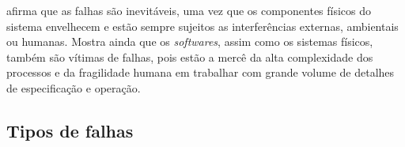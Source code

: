 afirma que as falhas são inevitáveis, uma vez que os
componentes físicos do sistema envelhecem e estão sempre sujeitos as
interferências externas, ambientais ou humanas. Mostra ainda que os {\it
softwares}, assim como os sistemas físicos, também são vítimas de falhas, pois
estão a mercê da alta complexidade dos processos e da fragilidade humana em
trabalhar com grande volume de detalhes de especificação e operação.

\subsection{Tipos de falhas}

